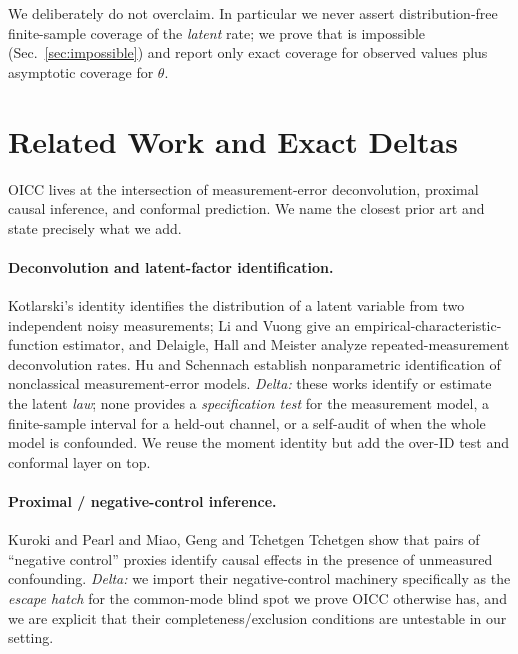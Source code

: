 \documentclass[11pt]{article}
\theoremstyle{definition}
\theoremstyle{remark}
\begin{document}
We deliberately do not overclaim. In particular we never assert
distribution-free finite-sample coverage of the \emph{latent} rate; we prove
that is impossible (Sec.~\ref{sec:impossible}) and report only exact coverage
for observed values plus asymptotic coverage for $\theta$.

\section{Related Work and Exact Deltas}\label{sec:related}

OICC lives at the intersection of measurement-error deconvolution,
proximal causal inference, and conformal prediction. We name the closest
prior art and state precisely what we add.

\paragraph{Deconvolution and latent-factor identification.}
Kotlarski's identity \cite{kotlarski1967} identifies the distribution of a
latent variable from two independent noisy measurements; Li and Vuong
\cite{livuong1998} give an empirical-characteristic-function estimator, and
Delaigle, Hall and Meister \cite{dhm2008} analyze repeated-measurement
deconvolution rates. Hu and Schennach \cite{huschennach2008} establish
nonparametric identification of nonclassical measurement-error models.
\emph{Delta:} these works identify or estimate the latent \emph{law}; none
provides a \emph{specification test} for the measurement model, a
finite-sample interval for a held-out channel, or a self-audit of when the
whole model is confounded. We reuse the moment identity but add the over-ID
test and conformal layer on top.

\paragraph{Proximal / negative-control inference.}
Kuroki and Pearl \cite{kurokipearl2014} and Miao, Geng and Tchetgen Tchetgen
\cite{miao2018} show that pairs of ``negative control'' proxies identify
causal effects in the presence of unmeasured confounding.
\emph{Delta:} we import their negative-control machinery specifically as the
\emph{escape hatch} for the common-mode blind spot we prove OICC otherwise
has, and we are explicit that their completeness/exclusion conditions are
untestable in our setting.
\end{document}
